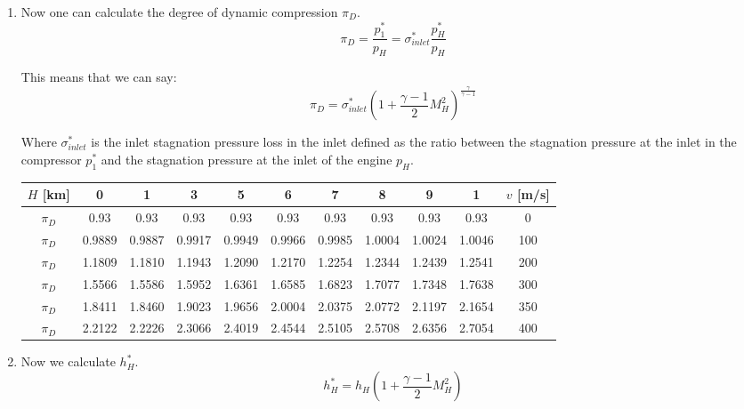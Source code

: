 \documentclass[titlepage]{article}
\begin{document}
\begin{enumerate}
  \item Now one can calculate the degree of dynamic compression $\pi_{D}$.
   \begin{equation}
      \pi_{D} = \frac{p_{1}^{*}}{p_{H}} = \sigma_{inlet}^{*} \frac{p_{H}^{*}}{p_{H}}
   \end{equation}


   This means that we can say:
   \begin{equation}
    \pi_{D} = \sigma_{inlet}^{*} \left(1+\frac{\gamma-1}{2} M_{H}^{2}\right)^{\frac{\gamma}{\gamma-1}}
   \end{equation}

   Where $\sigma_{inlet}^{*}$ is the inlet stagnation pressure loss in the inlet defined as the ratio between the stagnation pressure at the inlet
   in the compressor $p_{1}^{*}$ and the stagnation pressure at the inlet of the engine $p_{H}$.

   \begin{center}
    \begin{tabular}{c c c c c c c c c c c }
      \hline
      \textbf{$H$ [km]} & 0 & 1 & 3 & 5 & 6 & 7 & 8 & 9 & 1 & \textbf{$v$ [m/s]} \\
      \hline
      \textbf{$\pi_{D}$} & 0.93 &	0.93	& 0.93	& 0.93	& 0.93 &	0.93 & 	0.93 & 	0.93 & 	0.93 & 0 \\
      \hline
      \textbf{$\pi_{D}$} & 0.9889	& 0.9887	& 0.9917 & 	0.9949	& 0.9966	& 0.9985	& 1.0004 & 	1.0024 &	1.0046 & 100 \\
      \hline
      \textbf{$\pi_{D}$} & 1.1809	&1.1810	&1.1943	& 1.2090	&1.2170	& 1.2254 &	1.2344 &	1.2439 &	1.2541 & 200 \\
      \hline
      \textbf{$\pi_{D}$} &1.5566&	1.5586	&1.5952	&1.6361&	1.6585	&1.6823	&1.7077	&1.7348	&1.7638& 300 \\
      \hline
      \textbf{$\pi_{D}$} &1.8411	&1.8460	&1.9023	&1.9656	&2.0004	&2.0375	&2.0772	&2.1197	&2.1654& 350 \\
      \hline
      \textbf{$\pi_{D}$} &2.2122	&2.2226	&2.3066	&2.4019&	2.4544	&2.5105	&2.5708	&2.6356	& 2.7054& 400 \\
      \hline
    \end{tabular}
  \end{center}

  \item Now we calculate $h_{H}^{*}$.
   \begin{equation}
    h_{H}^{*} = h_{H}\left( 1+ \frac{\gamma-1}{2} M_{H}^{2} \right)
   \end{equation}  


\end{enumerate}
\end{document}
